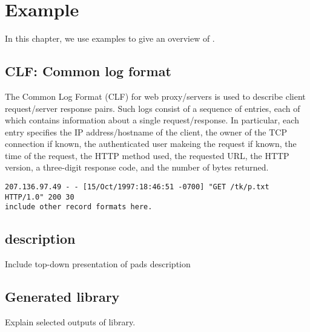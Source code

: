 \chapter{Example}
\label{chap:example}
In this chapter, we use examples to give an overview of \pads{}.

\section{CLF: Common log format}
\label{sec:example:common-log-format}
The Common Log Format (CLF) \cite{clf} for web proxy/servers is used
to describe client request/server response pairs.  Such logs consist
of a sequence of entries, each of which contains information about a
single request/response.  In particular, each entry specifies the IP
address/hostname of the client, the owner of the TCP connection if
known, the authenticated user makeing the request if known, the time
of the request, the HTTP method used, the requested URL, the HTTP
version, a three-digit response code, and the number of bytes
returned. 

\begin{verbatim}
207.136.97.49 - - [15/Oct/1997:18:46:51 -0700] "GET /tk/p.txt HTTP/1.0" 200 30
include other record formats here.
\end{verbatim}

\section{\padsl{} description}
\label{sec:example:padsl-description}
Include top-down presentation of pads description

\section{Generated library}
\label{sec:example:generated-library}
Explain selected outputs of library.